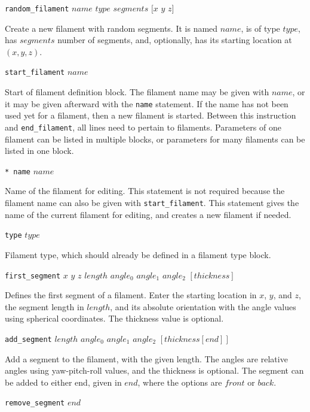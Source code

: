 \documentclass {scrbook}
\newcommand {\ttt} {\texttt}
\begin{document}
\begin{description}

\item{\ttt{random\_filament} $name$ $type$ $segments$ $[x$ $y$ $z]$}

Create a new filament with random segments. It is named $name$, is of type $type$, has $segments$ number of segments, and, optionally, has its starting location at $(x,y,z)$.

\item{\ttt{start\_filament} $name$}

Start of filament definition block. The filament name may be given with $name$, or it may be given afterward with the \ttt{name} statement. If the name has not been used yet for a filament, then a new filament is started. Between this instruction and \ttt{end\_filament}, all lines need to pertain to filaments. Parameters of one filament can be listed in multiple blocks, or parameters for many filaments can be listed in one block.

\item{\ttt{* name} $name$}

Name of the filament for editing. This statement is not required because the filament name can also be given with \ttt{start\_filament}. This statement gives the name of the current filament for editing, and creates a new filament if needed.

\item{\ttt{type} $type$}

Filament type, which should already be defined in a filament type block.

\item{\ttt{first\_segment} $x$ $y$ $z$ $length$ $angle_0$ $angle_1$ $angle_2$ $[thickness]$}

Defines the first segment of a filament. Enter the starting location in $x$, $y$, and $z$, the segment length in $length$, and its absolute orientation with the angle values using spherical coordinates. The thickness value is optional.

\item{\ttt{add\_segment} $length$ $angle_0$ $angle_1$ $angle_2$ $[thickness [end]]$}

Add a segment to the filament, with the given length. The angles are relative angles using yaw-pitch-roll values, and the thickness is optional. The segment can be added to either end, given in $end$, where the options are $front$ or $back$.

\item{\ttt{remove\_segment} $end$}


\end{description}
\end{document}
